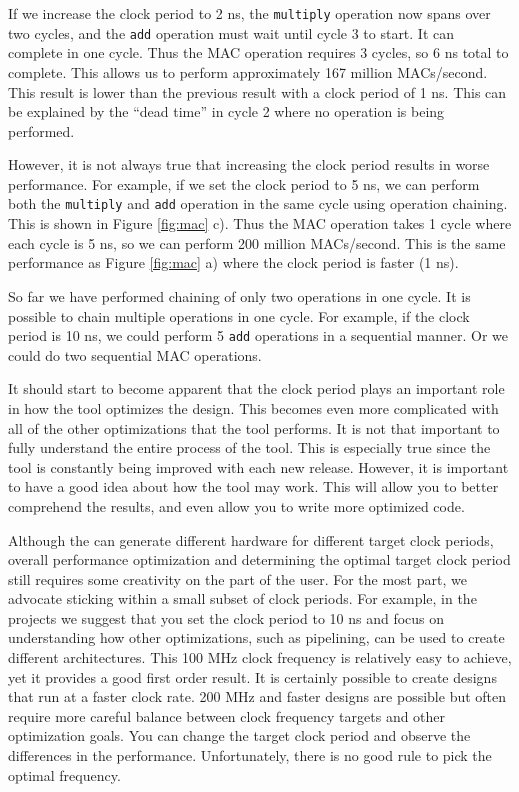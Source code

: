 If we increase the clock period to 2 ns, the \lstinline{multiply} operation now spans over two cycles, and the \lstinline{add} operation must wait until cycle 3 to start. It can complete in one cycle. Thus the MAC operation requires 3 cycles, so 6 ns total to complete. This allows us to perform approximately 167 million MACs/second. This result is lower than the previous result with a clock period of 1 ns. This can be explained by the ``dead time'' in cycle 2 where no operation is being performed.

However, it is not always true that increasing the clock period results in worse performance. For example, if we set the clock period to 5 ns, we can perform both the \lstinline{multiply} and \lstinline{add} operation in the same cycle using operation chaining. This is shown in Figure \ref{fig:mac} c). Thus the MAC operation takes 1 cycle where each cycle is 5 ns, so we can perform 200 million MACs/second. This is the same performance as Figure \ref{fig:mac} a) where the clock period is faster (1 ns). 

So far we have performed chaining of only two operations in one cycle. It is possible to chain multiple operations in one cycle. For example, if the clock period is 10 ns, we could perform 5 \lstinline{add} operations in a sequential manner. Or we could do two sequential MAC operations. 

It should start to become apparent that the clock period plays an important role in how the \VHLS tool optimizes the design. This becomes even more complicated with all of the other optimizations that the \VHLS tool performs. It is not that important to fully understand the entire process of the \VHLS tool. This is especially true since the tool is constantly being improved with each new release. However, it is important to have a good idea about how the tool may work. This will allow you to better comprehend the results, and even allow you to write more optimized code. 

Although the \VHLS can generate different hardware for different target clock periods, overall performance optimization and determining the optimal target clock period still requires some creativity on the part of the user. For the most part, we advocate sticking within a small subset of clock periods. For example, in the projects we suggest that you set the clock period to 10 ns and focus on understanding how other optimizations, such as pipelining, can be used to create different architectures. This 100 MHz clock frequency is relatively easy to achieve, yet it provides a good first order result. It is certainly possible to create designs that run at a faster clock rate.  200 MHz and faster designs are possible but often require more careful balance between clock frequency targets and other optimization goals.  You can change the target clock period and observe the differences in the performance. Unfortunately, there is no good rule to pick the optimal frequency. 

